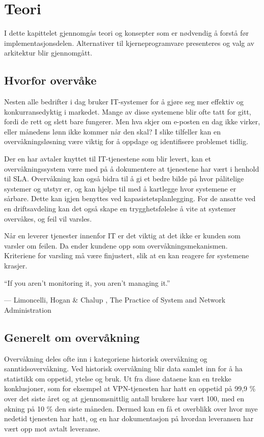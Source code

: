 \chapter{Teori}
I dette kapittelet gjennomgås teori og konsepter som er nødvendig å forstå før implementasjonsdelen. Alternativer til kjerneprogramvare presenteres og valg av arkitektur blir gjennomgått.
\clearpage
\section{Hvorfor overvåke}
Nesten alle bedrifter i dag bruker IT-systemer for å gjøre seg mer effektiv og konkurransedyktig i markedet. Mange av disse systemene blir ofte tatt for gitt, fordi de rett og slett bare fungerer. Men hva skjer om e-posten en dag ikke virker, eller månedens lønn ikke kommer når den skal? I slike tilfeller kan en overvåkningsløsning være viktig for å oppdage og identifisere problemet tidlig.

Der en har avtaler knyttet til IT-tjenestene som blir levert, kan et overvåkningssystem være med på å dokumentere at tjenestene har vært i henhold til SLA. Overvåkning kan også bidra til å gi et bedre bilde på hvor pålitelige systemer og utstyr er, og kan hjelpe til med å kartlegge hvor systemene er sårbare. Dette kan igjen benyttes ved kapasistetsplanlegging. For de ansatte ved en driftsavdeling kan det også skape en trygghetsfølelse å vite at systemer overvåkes, og feil vil varsles.

Når en leverer tjenester innenfor IT er det viktig at det ikke er kunden som varsler om feilen. Da ender kundene opp som overvåkningsmekanismen. Kriteriene for varsling må være finjustert, slik at en kan reagere før systemene krasjer.

\epigraph{``If you aren’t monitoring it, you aren’t managing it.''}{--- \textup{Limoncelli, Hogan \& Chalup }, The Practice of System and Network Administration\cite{practiceofsystemandnetwork}}

\section{Generelt om overvåkning}\label{sec:omovervakning}
Overvåkning deles ofte inn i kategoriene historisk overvåkning og sanntidsovervåkning. Ved historisk overvåkning blir data samlet inn for å ha statistikk om oppetid, ytelse og bruk. Ut fra disse dataene kan en trekke konklusjoner, som for eksempel at VPN-tjenesten har hatt en oppetid på 99,9 \% over det siste året og at gjennomsnittlig antall brukere har vært 100, med en økning på 10 \% den siste måneden. Dermed kan en få et overblikk over hvor mye nedetid tjenesten har hatt, og en har dokumentasjon på hvordan leveransen har vært opp mot avtalt leveranse.\cite{practiceofsystemandnetwork}

